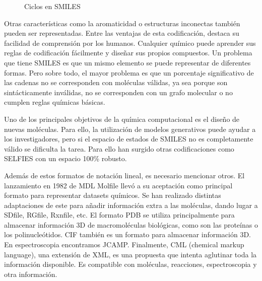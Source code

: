 \begin{figure}[H]
\centering
    \caption{Ciclos en SMILES} \label{fig:figura2}
\end{figure}

Otras características como la aromaticidad o estructuras inconectas también pueden ser representadas. Entre las ventajas de esta codificación, destaca su facilidad de comprensión por los humanos. Cualquier químico puede aprender sus reglas de codificación fácilmente y diseñar sus propios compuestos. Un problema que tiene SMILES es que un mismo elemento se puede representar de diferentes formas. Pero sobre todo, el mayor problema es que un porcentaje significativo de las cadenas no se corresponden con moléculas válidas, ya sea porque son sintácticamente inválidas, no se corresponden con un grafo molecular o no cumplen reglas químicas básicas. \cite{weininger1988smiles}

Uno de los principales objetivos de la química computacional es el diseño de nuevas moléculas. Para ello, la utilización de modelos generativos puede ayudar a los investigadores, pero si el espacio de estados de SMILES no es completamente válido se dificulta la tarea. Para ello han surgido otras codificaciones como SELFIES con un espacio 100\% robusto. \cite{Krenn_2020}

Además de estos formatos de notación lineal, es necesario mencionar otros. El lanzamiento en 1982 de MDL Molfile llevó a su aceptación como principal formato para representar datasets químicos. Se han realizado distintas adaptaciones de este para añadir información extra a las moléculas, dando lugar a SDfile, RGfile, Rxnfile, etc. El formato PDB se utiliza principalmente para almacenar información 3D de macromoléculas biológicas, como son las proteínas o los polinucleótidos. CIF también es un formato para almacenar información 3D. En espectroscopia encontramos JCAMP. Finalmente, CML (chemical markup language), una extensión de XML, es una propuesta que intenta aglutinar toda la información disponible. Es compatible con moléculas, reacciones, espectroscopia y otra información. \cite{doi:10.1021/ci600234z}

